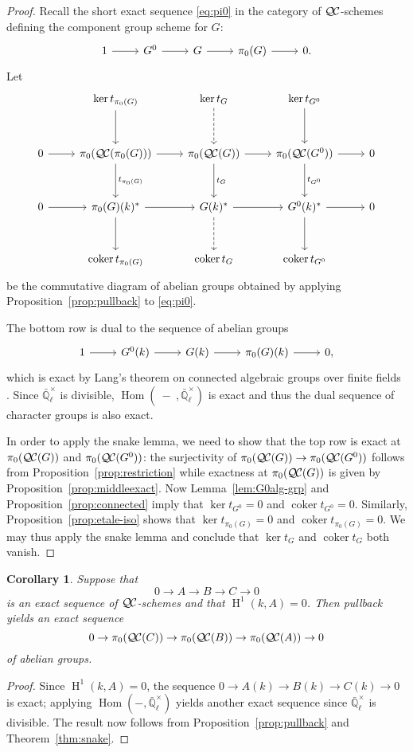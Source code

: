 \documentclass{amsart}
\theoremstyle{plain}
\newtheorem{corollary}[theorem]{Corollary}
\theoremstyle{definition}
\theoremstyle{remark}
\newcommand{\EE}{\mathbb{\bar Q}_\ell}
\newcommand{\Fq}{k}
\newcommand{\EEx}{\EE^\times}
\DeclareMathOperator{\Hom}{Hom}
\DeclareMathOperator{\coker}{coker}
\DeclareMathOperator{\Hh}{H}
\newcommand{\QC}{{\mathcal{Q\hskip-0.8pt C}}}
\newcommand{\QCiso}[1]{\pi_0 (\QC(#1))}
\newcommand{\trFrob}[1]{t_{#1}}
\begin{document}
\begin{proof}
  Recall the short exact sequence \eqref{eq:pi0} in the category of $\QC$-schemes
  defining the component group scheme for $G$:
  \[
  \begin{tikzcd}
    1 \rar & G^0 \rar & G \rar & \pi_0(G) \rar & 0.
  \end{tikzcd}
  \]
  Let
  \[
  \begin{tikzcd}[row sep=30]
    {}& \ker \trFrob{\pi_0(G)} \dar & \arrow[dashed]{d} \ker \trFrob{G} & \ker \trFrob{G^0} \dar & \\
    0 \rar & \QCiso{\pi_0(G)} \rar \dar{\trFrob{\pi_0(G)}}
    & \QCiso{G} \rar \dar{\trFrob{G}} & \QCiso{G^0} \rar \dar{\trFrob{G^0}} & 0\\
    0 \rar & \pi_0(G)(\Fq)^* \rar \dar
    & \arrow[dashed]{d} G(\Fq)^* \rar & G^0(\Fq)^* \rar \dar & 0\\
    & \coker \trFrob{\pi_0(G)} & \coker \trFrob{G} &  \coker \trFrob{G^0} &
  \end{tikzcd}
  \]
  be the commutative diagram of abelian groups obtained by applying
  Proposition~\ref{prop:pullback} to \eqref{eq:pi0}. 
  
  The bottom row is dual to the sequence of
  abelian groups
  \begin{equation}\label{eq:pi0k}
  \begin{tikzcd}
    1 \rar & G^0(\Fq) \rar & G(\Fq) \rar & \pi_0(G)(\Fq) \rar & 0,
  \end{tikzcd}
  \end{equation}
  which is exact by Lang's theorem on connected algebraic groups over finite fields \cite{lang:56a}.
  Since $\EEx$ is divisible, $\Hom(\ - \ ,\EEx)$ is exact and thus the dual sequence of
  character groups is also exact.
  
  In order to apply the snake lemma, we need to show that the top row is exact at $\QCiso{G}$ and $\QCiso{G^0}$:
  the surjectivity of $\QCiso{G} \to \QCiso{G^0}$ follows from Proposition~\ref{prop:restriction}
  while exactness at $\QCiso{G}$ is given by Proposition~\ref{prop:middleexact}.
  Now Lemma~\ref{lem:G0alg-grp} and Proposition~\ref{prop:connected}
  imply that $\ker \trFrob{G^0} =0$ and $\coker \trFrob{G^0}=0$. 
  Similarly, Proposition~\ref{prop:etale-iso} shows that $\ker \trFrob{\pi_0(G)}=0$
  and $\coker \trFrob{\pi_0(G)}=0$.
  We may thus apply the snake lemma and conclude that
  $\ker \trFrob{G}$ and $\coker \trFrob{G}$ both vanish.
\end{proof}


\begin{corollary}\label{cor:exact}
Suppose that
\[
0 \to A \to B \to C \to 0
\]
is an exact sequence of $\QC$-schemes and that $\Hh^1(\Fq, A) = 0$.
Then pullback yields an exact sequence
\[
0 \to \QCiso{C} \to \QCiso{B} \to \QCiso{A} \to 0
\]
of abelian groups.
\end{corollary}
\begin{proof}
Since $\Hh^1(k, A) = 0$, the sequence $0 \to A(\Fq) \to B(\Fq) \to C(\Fq) \to 0$ is exact;
applying $\Hom(-, \EEx)$ yields another exact sequence since $\EEx$ is divisible.  The result now follows
from Proposition~\ref{prop:pullback} and Theorem~\ref{thm:snake}.
\end{proof}
\end{document}
